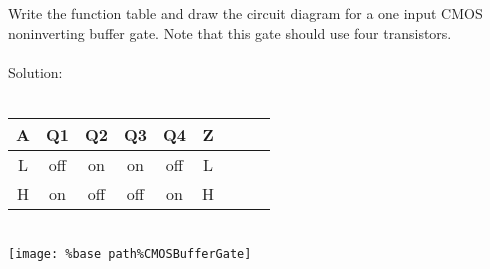 Write the function table and draw the circuit diagram for a one input CMOS noninverting buffer gate.  Note that this gate should use four transistors.\\ \\

Solution: \\ \\
\begin{tabular}{ccccccccc}
  \textbf{A} & \textbf{Q1} & \textbf{Q2} & \textbf{Q3} & \textbf{Q4} & \textbf{Z} \\
  \hline
  L & off & on & on & off & L\\
  H & on & off & off & on & H\\
\end{tabular} \\
\texttt{[image: \%base path\%CMOSBufferGate]}
